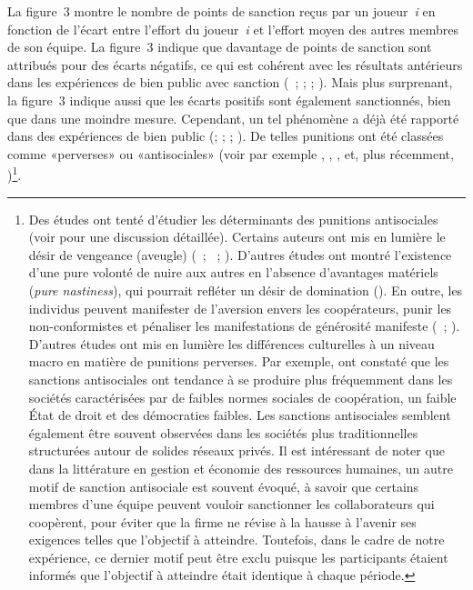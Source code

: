 \begin{Article}
\begin{refsection}[Lebourges]
La figure~3 montre le nombre de points de sanction reçus par un
joueur~\emph{i} en fonction de l'écart entre l'effort du joueur~\emph{i}
et l'effort moyen des autres membres de son équipe. La figure~3
indique que davantage de points de sanction sont attribués pour des
écarts négatifs, ce qui est cohérent avec les résultats antérieurs dans
les expériences de bien public avec sanction (\textcite{FehrGächter2000}~; \textcite{MascletNoussairTuckerVilleval2003}; \textcite{HerrmannThoniGächter2008}; \textcite{MascletVilleval2008}). Mais plus
surprenant, la figure~3 indique aussi que les écarts positifs sont
également sanctionnés, bien que dans une moindre mesure. Cependant, un
tel phénomène a déjà été rapporté dans des expériences de bien public
(\textcite{FehrGächter2000}; \textcite{MascletNoussairTuckerVilleval2003}; \textcite{HerrmannThoniGächter2008}; \textcite{MascletVilleval2008}).
De telles punitions ont été classées comme «perverses» ou
«antisociales» (voir par exemple \textcite{CinyabugumaPagePutterman2006}, \textcite{HerrmannThoniGächter2008}, \textcite{NikiforakisNoussairWilkening2012}, \textcite{DenantBoemontMascletNoussair2007} et, plus récemment, \textcite{FuPutterman2018})\footnote{Des études
  ont tenté d'étudier les déterminants des punitions antisociales (voir \textcite{GächterHerrmann2009} pour une discussion détaillée).
  Certains auteurs ont mis en lumière le désir de vengeance (aveugle)
  (\textcite{DenantBoemontMascletNoussair2007}~; \textcite{Nikiforakis2008}~; \textcite{HerrmannThoniGächter2008}). D'autres études
  ont montré l'existence d'une pure volonté de nuire aux autres en
  l'absence d'avantages matériels (\emph{pure nastiness}), qui pourrait
  refléter un désir de domination (\textcite{Zizzo2003}). En outre, les
  individus peuvent manifester de l'aversion envers les coopérateurs,
  punir les non-conformistes et pénaliser les manifestations de
  générosité manifeste (\textcite{CarpenterMatthews2012}~; \textcite{Henrich2006}). D'autres études ont mis en lumière les
  différences culturelles à un niveau macro en matière de punitions
  perverses. Par exemple, \textcite{HerrmannThoniGächter2008} ont
  constaté que les sanctions antisociales ont tendance à se produire
  plus fréquemment dans les sociétés caractérisées par de faibles normes
  sociales de coopération, un faible État de droit et des démocraties
  faibles. Les sanctions antisociales semblent également être souvent
  observées dans les sociétés plus traditionnelles structurées autour de
  solides réseaux privés. Il est intéressant de noter que dans la
  littérature en gestion et économie des ressources humaines, un autre
  motif de sanction antisociale est souvent évoqué, à savoir que
  certains membres d'une équipe peuvent vouloir sanctionner les
  collaborateurs qui coopèrent, pour éviter que la firme ne révise à la
  hausse à l'avenir ses exigences telles que l'objectif à atteindre.
  Toutefois, dans le cadre de notre expérience, ce dernier motif peut
  être exclu puisque les participants étaient informés que l'objectif à
  atteindre était identique à chaque période.}.


\end{refsection}
\end{Article}
